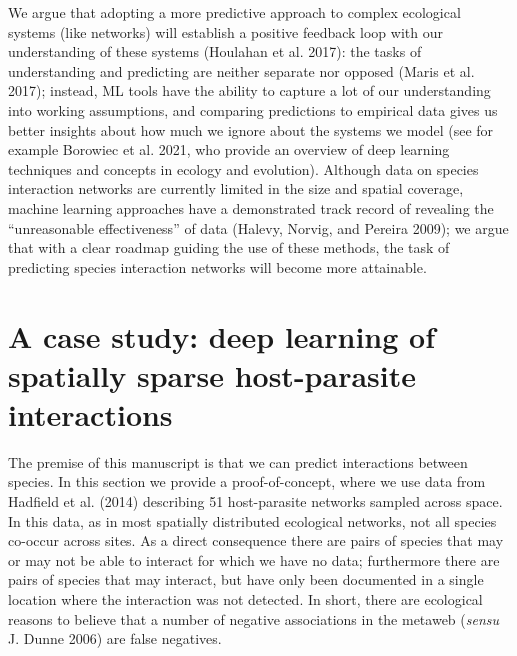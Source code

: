 \documentclass[11pt]{article}
\begin{document}
We argue that adopting a more predictive approach to complex ecological
systems (like networks) will establish a positive feedback loop with our
understanding of these systems (Houlahan et al. 2017): the tasks of
understanding and predicting are neither separate nor opposed (Maris et
al. 2017); instead, ML tools have the ability to capture a lot of our
understanding into working assumptions, and comparing predictions to
empirical data gives us better insights about how much we ignore about
the systems we model (see for example Borowiec et al. 2021, who provide
an overview of deep learning techniques and concepts in ecology and
evolution). Although data on species interaction networks are currently
limited in the size and spatial coverage, machine learning approaches
have a demonstrated track record of revealing the ``unreasonable
effectiveness'' of data (Halevy, Norvig, and Pereira 2009); we argue
that with a clear roadmap guiding the use of these methods, the task of
predicting species interaction networks will become more attainable.

\hypertarget{a-case-study-deep-learning-of-spatially-sparse-host-parasite-interactions}{%
\section{A case study: deep learning of spatially sparse host-parasite
interactions}\label{a-case-study-deep-learning-of-spatially-sparse-host-parasite-interactions}}

The premise of this manuscript is that we can predict interactions
between species. In this section we provide a proof-of-concept, where we
use data from Hadfield et al. (2014) describing 51 host-parasite
networks sampled across space. In this data, as in most spatially
distributed ecological networks, not all species co-occur across sites.
As a direct consequence there are pairs of species that may or may not
be able to interact for which we have no data; furthermore there are
pairs of species that may interact, but have only been documented in a
single location where the interaction was not detected. In short, there
are ecological reasons to believe that a number of negative associations
in the metaweb (\emph{sensu} J. Dunne 2006) are false negatives.
\end{document}
